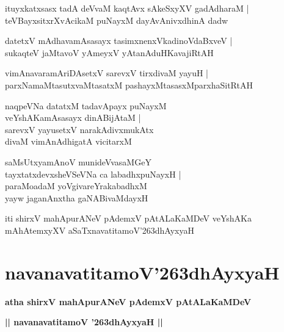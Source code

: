\documentclass[twoside,12pt,openright]{book}
\def\S{\char'263}
\newcounter{shloka}[chapter]
\begin{document}
\begin{shloka}%
ituyxkatxsasx tadA deVvaM kaqtAvx sAkeSxyXV gadAdharaM |\\
teVBayxsitxrXvAcikaM puNayxM dayAvAnivxdhinA dadw 
\end{shloka}

\begin{shloka}%
datetxV mAdhavamAsasayx tasimxnenxVkadinoVdaBxveV |\\
sukaqteV jaMtavoV yAmeyxV yAtanAduHKavajiRtAH 
\end{shloka}

\begin{shloka}%
vimAnavaramAriDAsetxV sarevxV tirxdivaM yayuH |\\
parxNamaMtasutxvaMtasatxM pashayxMtasasxMparxhaSitRtAH 
\end{shloka}

\begin{shloka}%
naqpeVNa datatxM tadavApayx puNayxM \\
veYshAKamAsasayx dinABijAtaM |\\
sarevxV yayusetxV narakAdivxmukAtx \\
divaM vimAnAdhigatA vicitarxM 
\end{shloka}

\begin{shloka}%
saMsUtxyamAnoV munideVvasaMGeY \\
tayxtatxdevxsheVSeVNa ca labadhxpuNayxH |\\
paraMoadaM yoVgivareYrakabadhxM \\
yayw jaganAnxtha gaNABivaMdayxH 
\end{shloka}


\begin{center}
iti shirxV mahApurANeV pAdemxV pAtALaKaMDeV veYshAKa mAhAtemxyXV 
aSaTxnavatitamoV\S dhAyxyaH
\end{center}

\chapter{navanavatitamoV\S dhAyxyaH}

\begin{center}
{\LARGE\bfseries atha shirxV mahApurANeV pAdemxV pAtALaKaMDeV }
\end{center}

\begin{center}         
{\LARGE\bfseries || navanavatitamoV \S dhAyxyaH ||}
\end{center}
\end{document}
